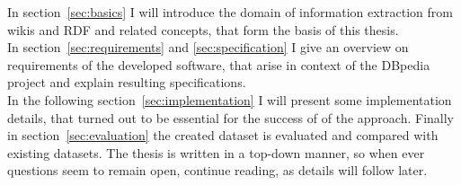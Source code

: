 In section~\ref{sec:basics} I will introduce the domain of information extraction from wikis and RDF and related concepts, that form the basis of this thesis.\\
In section~\ref{sec:requirements} and \ref{sec:specification} I give an overview on  requirements of the developed software, that arise in context of the DBpedia project and explain resulting specifications.\\
In the following section~\ref{sec:implementation} I will present some implementation details, that turned out to be essential for the success of of the approach. Finally in section~\ref{sec:evaluation} the created dataset is evaluated and compared with existing datasets. The thesis is written in a top-down manner, so when ever questions seem to remain open, continue reading, as details will follow later.

\newpage
